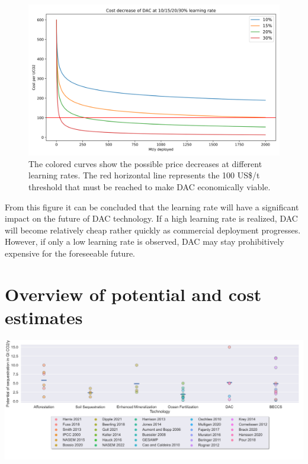 \begin{figure}[ht!]
    \includegraphics[width=\textwidth]{figures/dac_learning.png}
    \caption{The colored curves show the possible price decreases at different learning rates. The red horizontal line represents the 100 US\$/t threshold that must be reached to make DAC economically viable.}
\end{figure}
\newpage
From this figure it can be concluded that the learning rate will have a significant impact on the future of DAC technology. If a high learning rate is realized, DAC will become relatively cheap rather quickly as commercial deployment progresses. However, if only a low learning rate is observed, DAC may stay prohibitively expensive for the foreseeable future.

\chapter{Overview of potential and cost estimates}
 \mbox{} \begin{center}
    \begin{sideways}%
    \captionsetup{margin=0cm}
         \begin{minipage}{1.2\linewidth}
            \includegraphics[width=550pt, keepaspectratio]{figures/potential.png}
         \vspace{0.2cm}
         \label{fig:xx}
         \end{minipage}
    \end{sideways}
    \end{center}

